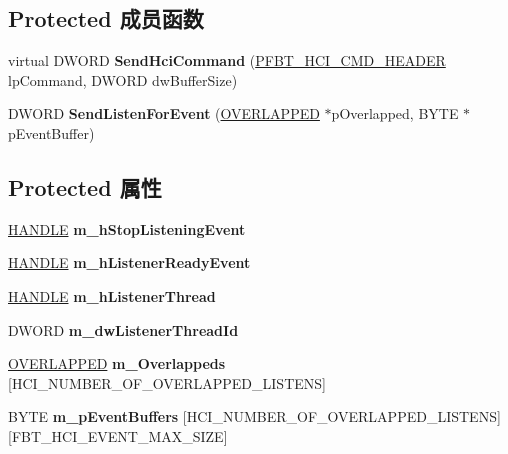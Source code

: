 \subsection*{Protected 成员函数}
\begin{DoxyCompactItemize}
\item 
\mbox{\label{class_c_hci_ad85efac0efdd4c47276c85d70fbabbbf}} 
virtual D\+W\+O\+RD {\bfseries Send\+Hci\+Command} (\hyperlink{struct_f_b_t___h_c_i___c_m_d___h_e_a_d_e_r}{P\+F\+B\+T\+\_\+\+H\+C\+I\+\_\+\+C\+M\+D\+\_\+\+H\+E\+A\+D\+ER} lp\+Command, D\+W\+O\+RD dw\+Buffer\+Size)
\item 
\mbox{\label{class_c_hci_aa825794e3ecb082355b04453635c2684}} 
D\+W\+O\+RD {\bfseries Send\+Listen\+For\+Event} (\hyperlink{struct___o_v_e_r_l_a_p_p_e_d}{O\+V\+E\+R\+L\+A\+P\+P\+ED} $\ast$p\+Overlapped, B\+Y\+TE $\ast$p\+Event\+Buffer)
\end{DoxyCompactItemize}
\subsection*{Protected 属性}
\begin{DoxyCompactItemize}
\item 
\mbox{\label{class_c_hci_aa1984e11e64c4301e9445aa4ede978fa}} 
\hyperlink{interfacevoid}{H\+A\+N\+D\+LE} {\bfseries m\+\_\+h\+Stop\+Listening\+Event}
\item 
\mbox{\label{class_c_hci_ac1e49fa2b1aa3397d568e77c0c8fb3d8}} 
\hyperlink{interfacevoid}{H\+A\+N\+D\+LE} {\bfseries m\+\_\+h\+Listener\+Ready\+Event}
\item 
\mbox{\label{class_c_hci_aeee6d75bfbabbaa5675cb8aa11e7f0a5}} 
\hyperlink{interfacevoid}{H\+A\+N\+D\+LE} {\bfseries m\+\_\+h\+Listener\+Thread}
\item 
\mbox{\label{class_c_hci_a6dab9ce087aa0799648c8e11d6e0f135}} 
D\+W\+O\+RD {\bfseries m\+\_\+dw\+Listener\+Thread\+Id}
\item 
\mbox{\label{class_c_hci_a77e1b61e4fa5e01bb9a08e24b3b54bbc}} 
\hyperlink{struct___o_v_e_r_l_a_p_p_e_d}{O\+V\+E\+R\+L\+A\+P\+P\+ED} {\bfseries m\+\_\+\+Overlappeds} \mbox{[}H\+C\+I\+\_\+\+N\+U\+M\+B\+E\+R\+\_\+\+O\+F\+\_\+\+O\+V\+E\+R\+L\+A\+P\+P\+E\+D\+\_\+\+L\+I\+S\+T\+E\+NS\mbox{]}
\item 
\mbox{\label{class_c_hci_a6ee3f62c14066ad3d34fbe6b4f29b351}} 
B\+Y\+TE {\bfseries m\+\_\+p\+Event\+Buffers} \mbox{[}H\+C\+I\+\_\+\+N\+U\+M\+B\+E\+R\+\_\+\+O\+F\+\_\+\+O\+V\+E\+R\+L\+A\+P\+P\+E\+D\+\_\+\+L\+I\+S\+T\+E\+NS\mbox{]}\mbox{[}F\+B\+T\+\_\+\+H\+C\+I\+\_\+\+E\+V\+E\+N\+T\+\_\+\+M\+A\+X\+\_\+\+S\+I\+ZE\mbox{]}
\end{DoxyCompactItemize}
